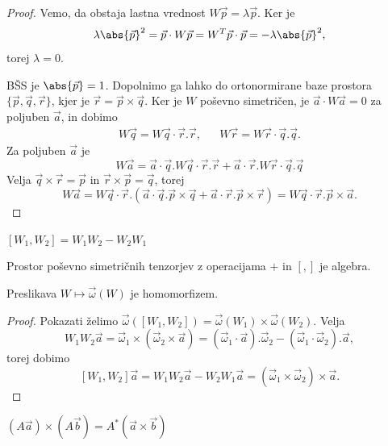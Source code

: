 \begin{proof}
  Vemo, da obstaja lastna vrednost $W \vec{p} = \lambda \vec{p}$.
  Ker je
  \[
	\lambda \abs{\vec{p}}^2 = \vec{p} \cdot W \vec{p}
	= W^T \vec{p} \cdot \vec{p} = - \lambda \abs{\vec{p}}^2,
  \]
  torej $\lambda = 0$.

  BŠS je $\abs{\vec{p}} = 1$.
  Dopolnimo ga lahko do ortonormirane baze prostora $\{\vec{p}, \vec{q},
  \vec{r}\}$, kjer je $\vec{r} = \vec{p} \times \vec{q}$.
  Ker je $W$ poševno simetričen, je $\vec{a}\cdot W \vec{a} = 0$ za poljuben
  $\vec{a}$, in dobimo
  \begin{align*}
	W \vec{q} = W \vec{q} \cdot \vec{r} . \vec{r},
	&& W \vec{r} = W \vec{r} \cdot \vec{q} . \vec{q}.
  \end{align*}
  Za poljuben $\vec{a}$ je
  \[
	W \vec{a} = \vec{a} \cdot \vec{q} . W \vec{q} \cdot \vec{r} . \vec{r}
	+ \vec{a} \cdot \vec{r} . W \vec{r} \cdot \vec{q} . \vec{q}
  \]
  Velja $\vec{q} \times \vec{r} = \vec{p}$ in $\vec{r} \times \vec{p} =
  \vec{q}$, torej
  \[
	W \vec{a} = W \vec{q} \cdot \vec{r} . (\vec{a} \cdot \vec{q} . \vec{p}
	\times \vec{q} + \vec{a} \cdot \vec{r} . \vec{p} \times \vec{r})
	= W \vec{q} \cdot \vec{r} . \vec{p} \times \vec{a}.
  \]
\end{proof}


\begin{definicija}
  $[W_1, W_2] = W_1 W_2 - W_2 W_1$
\end{definicija}

Prostor poševno simetričnih tenzorjev z operacijama $+$ in $[,]$ je algebra.

\begin{trditev}
  Preslikava $W \mapsto \vec{\omega}(W)$ je homomorfizem.
\end{trditev}

\begin{proof}
  Pokazati želimo $\vec{\omega}([W_1, W_2]) = \vec{\omega}(W_1) \times
  \vec{\omega}(W_2)$.
  Velja
  \[
	W_1 W_2 \vec{a} = \vec{\omega}_1 \times (\vec{\omega}_2 \times \vec{a})
	= (\vec{\omega}_1 \cdot \vec{a}). \vec{\omega}_2 - (\vec{\omega}_1 \cdot
	\vec{\omega}_2) . \vec{a},
  \]
  torej dobimo
  \[
	[W_1, W_2] \vec{a} = W_1 W_2 \vec{a} - W_2 W_1 \vec{a}
	= (\vec{\omega}_1 \times \vec{\omega}_2) \times \vec{a}.
  \]
\end{proof}

\begin{trditev}
  $(A \vec{a}) \times (A \vec{b}) = A^*(\vec{a} \times \vec{b})$
\end{trditev}

